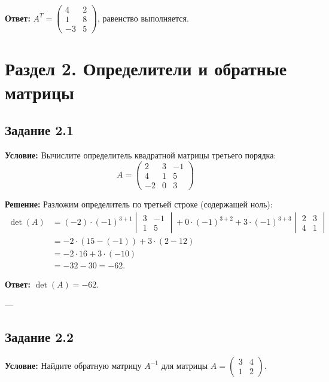 \documentclass[11pt, a4paper]{article}
\begin{document}
\textbf{Ответ:} $A^T = \begin{pmatrix} 4 & 2 \\ 1 & 8 \\ -3 & 5 \end{pmatrix}$, равенство выполняется.

\newpage

\section{Раздел 2. Определители и обратные матрицы}

\subsection*{Задание 2.1}
\textbf{Условие:} Вычислите определитель квадратной матрицы третьего порядка:
$$ A = \begin{pmatrix} 2 & 3 & -1 \\ 4 & 1 & 5 \\ -2 & 0 & 3 \end{pmatrix} $$

\textbf{Решение:}
Разложим определитель по третьей строке (содержащей ноль):
\begin{align*}
\det(A) &= (-2) \cdot (-1)^{3+1} \begin{vmatrix} 3 & -1 \\ 1 & 5 \end{vmatrix} + 0 \cdot (-1)^{3+2} + 3 \cdot (-1)^{3+3} \begin{vmatrix} 2 & 3 \\ 4 & 1 \end{vmatrix} \\
&= -2 \cdot (15 - (-1)) + 3 \cdot (2 - 12) \\
&= -2 \cdot 16 + 3 \cdot (-10) \\
&= -32 - 30 = -62.
\end{align*}

\textbf{Ответ:} $\det(A) = -62$.

---

\subsection*{Задание 2.2}
\textbf{Условие:} Найдите обратную матрицу $A^{-1}$ для матрицы $A = \begin{pmatrix} 3 & 4 \\ 1 & 2 \end{pmatrix}$.
\end{document}

